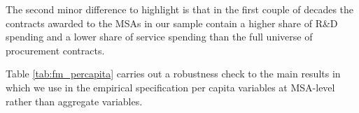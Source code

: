 \documentclass[dv_diss_main.tex]{subfiles}
\begin{document}
The second minor difference to highlight is that in the first couple of decades the contracts awarded to the MSAs in our sample contain a higher share of R\&D spending and a lower share of service spending than the full universe of procurement contracts.

\newpage 

Table \ref{tab:fm_percapita} carries out a robustness check to the main results in which we use in the empirical specification  per capita variables at MSA-level rather than aggregate variables.

\begin{table}[H]
    \begin{center}
    \caption{Fiscal Multipliers - Earnings Per Capita}
\end{center}
\end{table}
\end{document}
